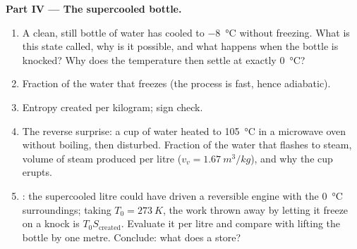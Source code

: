 \begin{problem}
\medskip
\noindent\textbf{Part IV --- The supercooled bottle.}
\begin{enumerate}[resume]
  \item A clean, still bottle of water has cooled to \qty{-8}{\degreeCelsius}
        without freezing. What is this state called, why is it possible,
        and what happens when the bottle is knocked? Why does the
        temperature then settle at exactly \qty{0}{\degreeCelsius}?
  \item Fraction of the water that freezes (the process is fast, hence
        adiabatic).
  \item Entropy created per kilogram; sign check.
  \item The reverse surprise: a cup of water heated to \qty{105}{\degreeCelsius}
        in a microwave oven without boiling, then disturbed. Fraction
        of the water that flashes to steam, volume of steam produced per
        litre ($v_v = \qty{1.67}{m^3/kg}$), and why the cup erupts.
  \item {}: the supercooled litre could have driven a reversible
        engine with the \qty{0}{\degreeCelsius} surroundings; taking
        $T_0 = \qty{273}{K}$, the work thrown away by letting it freeze on a
        knock is $T_0S_{\mathrm{created}}$. Evaluate it per litre and
        compare with lifting the bottle by one metre. Conclude: what does
        a  store?
\end{enumerate}
\end{problem}
